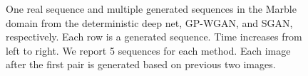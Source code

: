 \documentclass[letterpaper]{article} %
\begin{document}
\begin{figure}
{}
\caption{One real sequence and multiple generated sequences in the Marble domain from the deterministic deep net, GP-WGAN, and SGAN, respectively. Each row is a generated sequence. Time increases from left to right. We report 5 sequences for each method. Each image after the first pair is generated based on previous two images.}
\label{figure-marble}
\end{figure}
\end{document}
